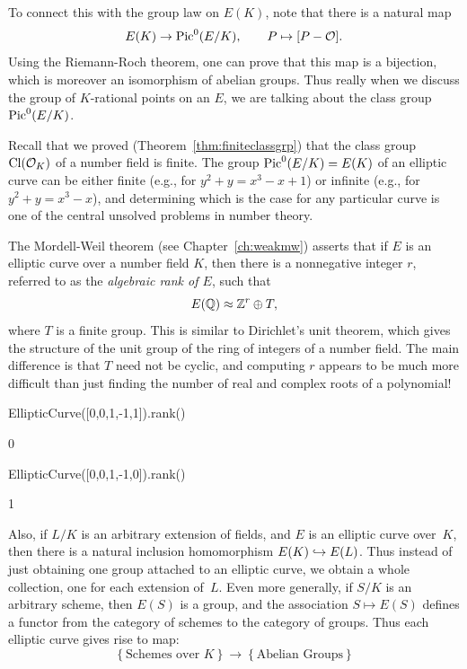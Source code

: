 To connect this with the group law on $E(K)$, note that there
is a natural map
$$
 E(K) \to \operatorname{Pic}^0(E/K), \qquad P \mapsto [P-\mathcal{O}].
$$
Using the Riemann-Roch theorem, one can prove that this map
is a bijection, which is moreover an isomorphism of abelian groups.
Thus really when we discuss the group of $K$-rational
points on an $E$, we are talking
about the class group $\operatorname{Pic}^0(E/K)$.

Recall that we proved (Theorem~\ref{thm:finiteclassgrp}) that the
class group $\operatorname{Cl}(\mathcal{O}_K)$ of a number field is finite.
The  group $\operatorname{Pic}^0(E/K) =E(K)$ of an elliptic curve can be
either finite (e.g., for $y^2 + y = x^3 - x + 1$) or infinite (e.g.,
for $y^2 + y = x^3 - x$), and determining which is the case for any particular
curve is one of the central unsolved problems in number theory.

The Mordell-Weil theorem (see Chapter~\ref{ch:weakmw}) asserts that if $E$ is
an elliptic curve over a number field $K$, then there is a nonnegative integer
$r$, referred to as the \emph{algebraic rank of $E$}, such that
\begin{equation}\label{eqn:mw}
  E(\mathbb{Q}) \approx \mathbb{Z}^r \oplus T,
\end{equation}
where $T$ is a finite group.   This is similar to Dirichlet's unit theorem, which
gives the structure of the unit group of the ring of integers of a number field.
The main difference is that $T$ need not be cyclic, and computing $r$ appears to be
much more difficult than just finding the number of real and complex roots of
a polynomial!
\begin{sagecode}
\begin{sagecell}
EllipticCurve([0,0,1,-1,1]).rank()
\end{sagecell}
\begin{sageout}
0
\end{sageout}
\begin{sagecell}
EllipticCurve([0,0,1,-1,0]).rank()
\end{sagecell}
\begin{sageout}
1
\end{sageout}
\end{sagecode}

Also, if $L/K$ is an arbitrary extension of fields, and $E$ is an
elliptic curve over~$K$, then there is a natural inclusion
homomorphism $E(K)\hookrightarrow E(L)$.  Thus instead of just obtaining one group
attached to an elliptic curve, we obtain a whole collection, one for
each extension of~$L$.  Even more generally, if $S/K$ is an arbitrary
scheme, then $E(S)$ is a group, and the association $S\mapsto E(S)$
defines a functor from the category of schemes to the category of
groups.  Thus each elliptic curve gives rise to map:
$$
 \left\{\text{Schemes over $K$}\right\} \longrightarrow
\left\{\text{Abelian Groups}\right\}
$$

